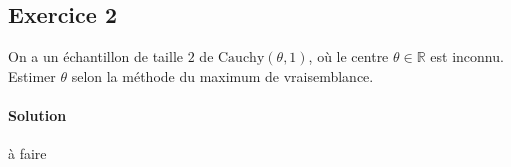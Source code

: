 \documentclass[../main.tex]{subfiles}
\begin{document}
\begin{CJK*}{UTF8}{gbsn}

\section*{Exercice 2}

On a un échantillon de taille $2$ de $\text{Cauchy}(\theta, 1)$, où le centre $\theta \in \mathbb{R}$ est inconnu.
Estimer $\theta$ selon la méthode du maximum de vraisemblance. 

\paragraph{Solution}

à faire
\end{CJK*}
\end{document}
